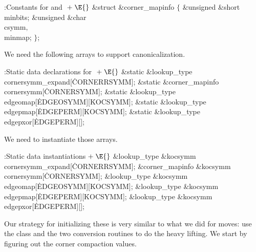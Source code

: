\Y\B\4:Constants for  and \X${}\mathrel+%
\E{}$\6
\&{struct} \&{corner\_mapinfo} ${}\{{}$\1\6
\&{unsigned} \&{short} \\{minbits};\6
\&{unsigned} \&{char} \\{csymm}${},{}$ \\{minmap};\2\6
${}\}{}$;\par
\fi

We need the following arrays to support canonicalization.

\Y\B\4:Static data declarations for \X${}\mathrel+\E{}$\6
\&{static} \&{lookup\_type} \\{cornersymm\_expand}[\.{CORNERRSYMM}];\6
\&{static} \&{corner\_mapinfo} \\{cornersymm}[\.{CORNERSYMM}];\6
\&{static} \&{lookup\_type} \\{edgeomap}[\.{EDGEOSYMM}][\.{KOCSYMM}];\6
\&{static} \&{lookup\_type} \\{edgepmap}[\.{EDGEPERM}][\.{KOCSYMM}];\6
\&{static} \&{lookup\_type} \\{edgepxor}[\.{EDGEPERM}][];\par
\fi

We need to instantiate those arrays.

\Y\B\4:Static data instantiations\X${}\mathrel+\E{}$\6
\&{lookup\_type} \&{kocsymm}\DC\\{cornersymm\_expand}[\.{CORNERRSYMM}];\6
\&{corner\_mapinfo} \&{kocsymm}\DC\\{cornersymm}[\.{CORNERSYMM}];\6
\&{lookup\_type} \&{kocsymm}\DC\\{edgeomap}[\.{EDGEOSYMM}][\.{KOCSYMM}];\6
\&{lookup\_type} \&{kocsymm}\DC\\{edgepmap}[\.{EDGEPERM}][\.{KOCSYMM}];\6
\&{lookup\_type} \&{kocsymm}\DC\\{edgepxor}[\.{EDGEPERM}][];\par
\fi

Our strategy for initializing these is very similar to what we did
for moves: use the  class and the two conversion routines to
do the heavy lifting.  We start by figuring out the corner
compaction values.

